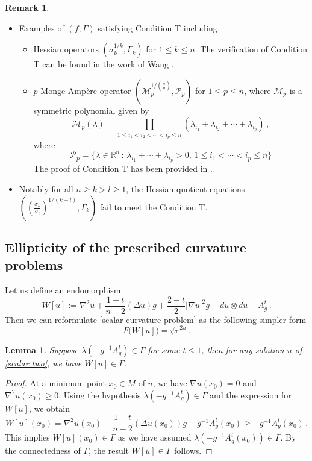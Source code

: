 \documentclass{article}
\newcommand{\R}{\mathbb{R}}
\theoremstyle{plain}
\newtheorem{lemma}[theorem]{Lemma}
\theoremstyle{definition}
\newtheorem{remark}[theorem]{Remark}
\theoremstyle{definition}
\numberwithin{equation}{section}
\begin{document}
\begin{sloppypar}
\begin{remark}\label{example}
\begin{itemize}\itemsep 0.5em
\item[(1)] Examples of $(f,\Gamma)$ satisfying Condition  T including 
\begin{itemize}
\item[(i)] Hessian operators $(\sigma_{k}^{1/k},\Gamma_{k})$ for $1\leq k\leq n$. The verification of Condition T can be found in the work of Wang \cite{W94}.
\item[(ii)] $p$-Monge-Amp\`ere operator $(\mathcal{M}^{1/\binom{n}{p}}_{p},\mathcal{P}_{p})$ for $1\leq p\leq n$, where $\mathcal{M}_{p}$ is a symmetric polynomial given by
\begin{equation}
\mathcal{M}_{p}(\lambda)=\prod_{1\leq i_1<i_2<\cdots <i_{p}\leq n} (\lambda_{i_1}+\lambda_{i_2}+\cdots +\lambda_{i_p})\,,
\end{equation}
where
\begin{equation}
\mathcal{P}_{p}=\{ \lambda\in \R^n \,: \,\lambda_{i_1}+\cdots +\lambda_{i_{p}}>0,\, 1\leq i_1<\cdots< i_{p}\leq n\}
\end{equation}
The proof of Condition T has been provided in \cite{D21,ZZ25}. 
\end{itemize} 
\item[(2)] Notably for all $n\geq k>l\geq 1$, the Hessian quotient equations  $((\frac{\sigma_{k}}{\sigma_{l}})^{1/(k-l)}, \Gamma_{k})$  fail to meet the  Condition T.
\end{itemize}
\end{remark}




\subsection{Ellipticity of the prescribed curvature problems}
Let us define an endomorphism
\begin{equation}\label{Wu}
W[u]:=\nabla^2u+\frac{1-t}{n-2}(\Delta u)g+\frac{2-t}{2}|\nabla u|^2g-du\otimes du-A^{t}_{g}\,.
\end{equation}
Then we can reformulate \eqref{scalar curvature problem} as the following simpler form
\begin{equation}\label{scalar two}
F\big(W[u]\big) =\psi e^{2u}\,.
\end{equation}
\begin{lemma}\label{elliptic 1}
Suppose $\lambda(-g^{-1}A_{g}^{t})\in \Gamma$ for some $t\leq 1$, then for any solution $u$ of \eqref{scalar two}, we have $W[u] \in \Gamma$.
\end{lemma}
\begin{proof}
At a minimum point $x_0 \in M$ of $u$, we have $\nabla u(x_0)=0$ and $\nabla^2 u(x_0) \geq 0$. Using the hypothesis $\lambda(-g^{-1}A_{g}^{t})\in \Gamma$ and the expression for $W[u]$, we obtain
\[
W[u](x_0)=\nabla^2u(x_0)+\frac{1-t}{n-2}(\Delta u(x_0))g-g^{-1}A_{g}^{t}(x_0)\geq -g^{-1}A_{g}^{t}(x_0)\,. 
\]  
This implies $W[u](x_0) \in \Gamma$ as we have assumed $\lambda(-g^{-1}A_g^t(x_0)) \in \Gamma$. By the connectedness of $\Gamma$, the result $W[u] \in \Gamma$ follows.
\end{proof}


\end{sloppypar}
\end{document}
